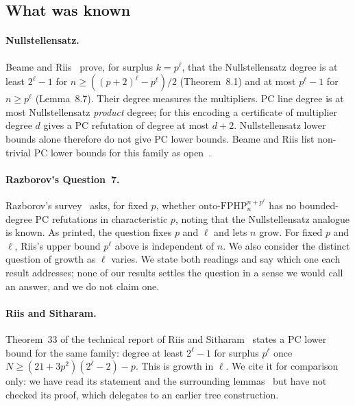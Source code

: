 \subsection{What was known}\label{sec:intro-known}

\paragraph{Nullstellensatz.}  Beame and Riis~\cite[Thm.~8.1, Lemma~8.7]{beame1998counting}
prove, for surplus $k=p^\ell$, that the Nullstellensatz degree is at least $2^\ell-1$ for
$n\ge((p+2)^\ell-p^\ell)/2$ (Theorem~8.1) and at most $p^\ell-1$ for $n\ge p^\ell$
(Lemma~8.7).  Their degree measures the multipliers.  PC line degree is at most
Nullstellensatz \emph{product} degree; for this encoding a certificate of multiplier degree
$d$ gives a PC refutation of degree at most $d+2$.  Nullstellensatz lower bounds alone
therefore do not give PC lower bounds.  Beame and Riis list non-trivial PC
lower bounds for this family as open~\cite[\S10]{beame1998counting}.

\paragraph{Razborov's Question~7.}  Razborov's survey~\cite[\S7, Question~7]{razborov2001php}
asks, for fixed $p$, whether $\mathrm{onto\text{-}FPHP}^{n+p^\ell}_n$ has no bounded-degree
PC refutations in characteristic $p$, noting that the Nullstellensatz analogue is known.
As printed, the question fixes $p$ and $\ell$ and lets $n$ grow.  For fixed $p$ and $\ell$,
Riis's upper bound $p^\ell$ above is independent of $n$.  We also consider the distinct
question of growth as $\ell$ varies.  We state both readings and say which one each result addresses; none of
our results settles the question in a sense we would call an answer, and we do not claim
one.

\paragraph{Riis and Sitharam.}  Theorem~33 of the technical report of Riis and
Sitharam~\cite{riis1997nonconstant} states a PC lower bound for the same family: degree at
least $2^\ell-1$ for surplus $p^\ell$ once
$N\ge(21+3p^2)(2^\ell-2)-p$.  This is growth in $\ell$.  We cite it for comparison only:
we have read its statement and the surrounding lemmas~\cite[pp.~36--38]{riis1997nonconstant}
but have not checked its proof, which delegates to an earlier tree construction.

